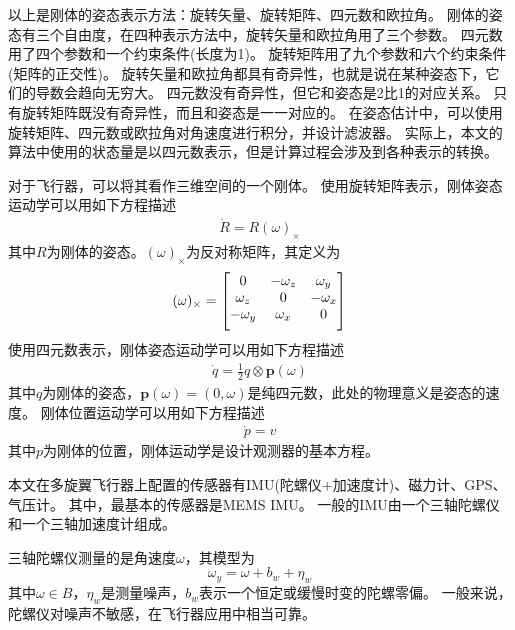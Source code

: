 \documentclass[
  type=master
]{gdutthesis}
\begin{document}
以上是刚体的姿态表示方法：旋转矢量、旋转矩阵、四元数和欧拉角。
刚体的姿态有三个自由度，在四种表示方法中，旋转矢量和欧拉角用了三个参数。
四元数用了四个参数和一个约束条件(长度为1)。
旋转矩阵用了九个参数和六个约束条件(矩阵的正交性)。
旋转矢量和欧拉角都具有奇异性，也就是说在某种姿态下，它们的导数会趋向无穷大。
四元数没有奇异性，但它和姿态是2比1的对应关系。
只有旋转矩阵既没有奇异性，而且和姿态是一一对应的。
在姿态估计中，可以使用旋转矩阵、四元数或欧拉角对角速度进行积分，并设计滤波器。
实际上，本文的算法中使用的状态量是以四元数表示，但是计算过程会涉及到各种表示的转换。

对于飞行器，可以将其看作三维空间的一个刚体。
使用旋转矩阵表示，刚体姿态运动学可以用如下方程描述
\begin{gather}\label{eq:matrixkinematics}
	\dot{R}=R (\omega)_{\times}
\end{gather}
其中$R$为刚体的姿态。$(\omega)_{\times}$为反对称矩阵，其定义为
\begin{gather}\label{eq:matrixkinematics}
	(\omega)_{\times}=
	\begin{bmatrix}
		0 & -\omega_z & \omega_y\\
		\omega_z & 0 & -\omega_x\\
		-\omega_y & \omega_x & 0\vspace{1ex}
	\end{bmatrix}
\end{gather}
\vspace{1ex}使用四元数表示，刚体姿态运动学可以用如下方程描述
\begin{gather}\label{eq:quatkinematics}
	\dot{q}=\frac{1}{2} q \otimes \mathbf{p}(\omega)
\end{gather}
其中$q$为刚体的姿态，$\mathbf{p}(\omega)=(0,\omega)$是纯四元数，此处的物理意义是姿态的速度。
刚体位置运动学可以用如下方程描述
\begin{gather}\label{eq:matrixkinematics}
	\dot{p}=v
\end{gather}
其中$p$为刚体的位置，刚体运动学是设计观测器的基本方程。

本文在多旋翼飞行器上配置的传感器有IMU(陀螺仪+加速度计)、磁力计、GPS、气压计。
其中，最基本的传感器是MEMS IMU。
一般的IMU由一个三轴陀螺仪和一个三轴加速度计组成。

三轴陀螺仪测量的是角速度$\omega$，其模型为
\begin{equation}\label{eq:gyromodel}
	\omega_y=\omega+b_w+\eta_w
\end{equation}
其中$\omega \in B$，$\eta_w$是测量噪声，$b_w$表示一个恒定或缓慢时变的陀螺零偏。
一般来说，陀螺仪对噪声不敏感，在飞行器应用中相当可靠。
\end{document}
